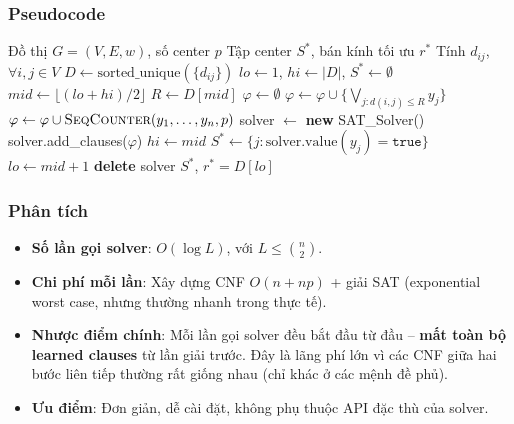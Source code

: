 \documentclass[11pt,a4paper]{article}
\begin{document}
\subsubsection{Pseudocode}

\begin{algorithm}[H]
\caption{Non-Incremental SAT cho P-Center}
\label{alg:non_incremental}
\begin{algorithmic}[1]
\Require Đồ thị $G=(V,E,w)$, số center $p$
\Ensure Tập center $S^*$, bán kính tối ưu $r^*$
\State Tính $d_{ij}$, $\forall i,j \in V$
\State $D \gets \text{sorted\_unique}(\{d_{ij}\})$
\State $lo \gets 1$, $hi \gets |D|$, $S^* \gets \emptyset$
    \State $mid \gets \lfloor (lo + hi) / 2 \rfloor$
    \State $R \gets D[mid]$
    \State $\varphi \gets \emptyset$ 
        \State $\varphi \gets \varphi \cup \big\{  \bigvee_{j: d(i,j) \le R} y_j \big\}$ 
    \EndFor
    \State $\varphi \gets \varphi \cup \textsc{SeqCounter}(y_1, \dots, y_n, p)$ 
    \State solver $\gets$ \textbf{new} SAT\_Solver()
    \State solver.add\_clauses($\varphi$)
        \State $hi \gets mid$
        \State $S^* \gets \{j : \text{solver.value}(y_j) = \texttt{true}\}$
    \Else
        \State $lo \gets mid + 1$
    \EndIf
    \State \textbf{delete} solver 
\EndWhile
\State \Return $S^*$, $r^* = D[lo]$
\end{algorithmic}
\end{algorithm}

\subsubsection{Phân tích}

\begin{itemize}[nosep]
    \item \textbf{Số lần gọi solver}: $O(\log L)$, với $L \le \binom{n}{2}$.
    \item \textbf{Chi phí mỗi lần}: Xây dựng CNF $O(n + np)$ + giải SAT (exponential worst case, nhưng thường nhanh trong thực tế).
    \item \textbf{Nhược điểm chính}: Mỗi lần gọi solver đều bắt đầu từ đầu -- \textbf{mất toàn bộ learned clauses} từ lần giải trước. Đây là lãng phí lớn vì các CNF giữa hai bước liên tiếp thường rất giống nhau (chỉ khác ở các mệnh đề phủ).
    \item \textbf{Ưu điểm}: Đơn giản, dễ cài đặt, không phụ thuộc API đặc thù của solver.
\end{itemize}
\end{document}

